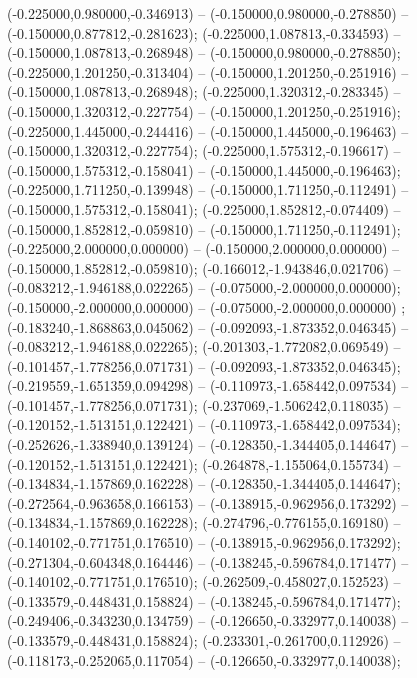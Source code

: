  (-0.225000,0.980000,-0.346913) -- (-0.150000,0.980000,-0.278850) -- (-0.150000,0.877812,-0.281623);
 (-0.225000,1.087813,-0.334593) -- (-0.150000,1.087813,-0.268948) -- (-0.150000,0.980000,-0.278850);
 (-0.225000,1.201250,-0.313404) -- (-0.150000,1.201250,-0.251916) -- (-0.150000,1.087813,-0.268948);
 (-0.225000,1.320312,-0.283345) -- (-0.150000,1.320312,-0.227754) -- (-0.150000,1.201250,-0.251916);
 (-0.225000,1.445000,-0.244416) -- (-0.150000,1.445000,-0.196463) -- (-0.150000,1.320312,-0.227754);
 (-0.225000,1.575312,-0.196617) -- (-0.150000,1.575312,-0.158041) -- (-0.150000,1.445000,-0.196463);
 (-0.225000,1.711250,-0.139948) -- (-0.150000,1.711250,-0.112491) -- (-0.150000,1.575312,-0.158041);
 (-0.225000,1.852812,-0.074409) -- (-0.150000,1.852812,-0.059810) -- (-0.150000,1.711250,-0.112491);
 (-0.225000,2.000000,0.000000) -- (-0.150000,2.000000,0.000000) -- (-0.150000,1.852812,-0.059810);
 (-0.166012,-1.943846,0.021706) -- (-0.083212,-1.946188,0.022265) -- (-0.075000,-2.000000,0.000000);
 (-0.150000,-2.000000,0.000000) -- (-0.075000,-2.000000,0.000000) ;
 (-0.183240,-1.868863,0.045062) -- (-0.092093,-1.873352,0.046345) -- (-0.083212,-1.946188,0.022265);
 (-0.201303,-1.772082,0.069549) -- (-0.101457,-1.778256,0.071731) -- (-0.092093,-1.873352,0.046345);
 (-0.219559,-1.651359,0.094298) -- (-0.110973,-1.658442,0.097534) -- (-0.101457,-1.778256,0.071731);
 (-0.237069,-1.506242,0.118035) -- (-0.120152,-1.513151,0.122421) -- (-0.110973,-1.658442,0.097534);
 (-0.252626,-1.338940,0.139124) -- (-0.128350,-1.344405,0.144647) -- (-0.120152,-1.513151,0.122421);
 (-0.264878,-1.155064,0.155734) -- (-0.134834,-1.157869,0.162228) -- (-0.128350,-1.344405,0.144647);
 (-0.272564,-0.963658,0.166153) -- (-0.138915,-0.962956,0.173292) -- (-0.134834,-1.157869,0.162228);
 (-0.274796,-0.776155,0.169180) -- (-0.140102,-0.771751,0.176510) -- (-0.138915,-0.962956,0.173292);
 (-0.271304,-0.604348,0.164446) -- (-0.138245,-0.596784,0.171477) -- (-0.140102,-0.771751,0.176510);
 (-0.262509,-0.458027,0.152523) -- (-0.133579,-0.448431,0.158824) -- (-0.138245,-0.596784,0.171477);
 (-0.249406,-0.343230,0.134759) -- (-0.126650,-0.332977,0.140038) -- (-0.133579,-0.448431,0.158824);
 (-0.233301,-0.261700,0.112926) -- (-0.118173,-0.252065,0.117054) -- (-0.126650,-0.332977,0.140038);
